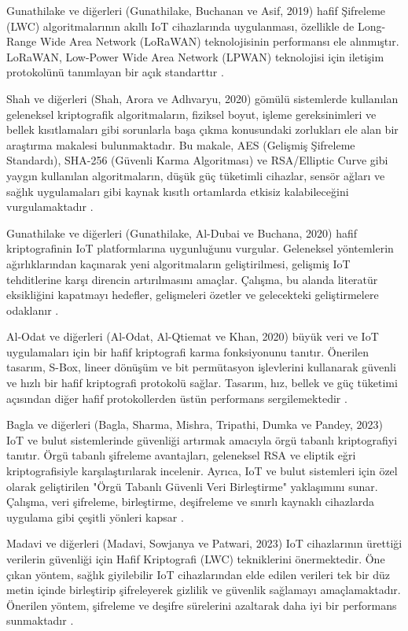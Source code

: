 \documentclass[conference, a4paper]{IEEEtran}
\begin{document}
    Gunathilake ve diğerleri (Gunathilake, Buchanan ve Asif, 2019) hafif Şifreleme (LWC) algoritmalarının akıllı IoT cihazlarında uygulanması, özellikle de Long-Range Wide Area Network (LoRaWAN) teknolojisinin performansı ele alınmıştır. LoRaWAN, Low-Power Wide Area Network (LPWAN) teknolojisi için iletişim protokolünü tanımlayan bir açık standarttır \cite{paper2}.

    Shah ve diğerleri (Shah, Arora ve Adhvaryu, 2020) gömülü sistemlerde kullanılan geleneksel kriptografik algoritmaların, fiziksel boyut, işleme gereksinimleri ve bellek kısıtlamaları gibi sorunlarla başa çıkma konusundaki zorlukları ele alan bir araştırma makalesi bulunmaktadır. Bu makale, AES (Gelişmiş Şifreleme Standardı), SHA-256 (Güvenli Karma Algoritması) ve RSA/Elliptic Curve gibi yaygın kullanılan algoritmaların, düşük güç tüketimli cihazlar, sensör ağları ve sağlık uygulamaları gibi kaynak kısıtlı ortamlarda etkisiz kalabileceğini vurgulamaktadır \cite{paper3}.

    Gunathilake ve diğerleri (Gunathilake, Al-Dubai ve Buchana, 2020) hafif kriptografinin IoT platformlarına uygunluğunu vurgular. Geleneksel yöntemlerin ağırlıklarından kaçınarak yeni algoritmaların geliştirilmesi, gelişmiş IoT tehditlerine karşı direncin artırılmasını amaçlar. Çalışma, bu alanda literatür eksikliğini kapatmayı hedefler, gelişmeleri özetler ve gelecekteki geliştirmelere odaklanır \cite{paper4}.

    Al-Odat ve diğerleri (Al-Odat, Al-Qtiemat ve Khan, 2020) büyük veri ve IoT uygulamaları için bir hafif kriptografi karma fonksiyonunu tanıtır. Önerilen tasarım, S-Box, lineer dönüşüm ve bit permütasyon işlevlerini kullanarak güvenli ve hızlı bir hafif kriptografi protokolü sağlar. Tasarım, hız, bellek ve güç tüketimi açısından diğer hafif protokollerden üstün performans sergilemektedir \cite{paper5}.

    Bagla ve diğerleri (Bagla, Sharma, Mishra, Tripathi, Dumka ve Pandey, 2023) IoT ve bulut sistemlerinde güvenliği artırmak amacıyla örgü tabanlı kriptografiyi tanıtır. Örgü tabanlı şifreleme avantajları, geleneksel RSA ve eliptik eğri kriptografisiyle karşılaştırılarak incelenir. Ayrıca, IoT ve bulut sistemleri için özel olarak geliştirilen "Örgü Tabanlı Güvenli Veri Birleştirme" yaklaşımını sunar. Çalışma, veri şifreleme, birleştirme, deşifreleme ve sınırlı kaynaklı cihazlarda uygulama gibi çeşitli yönleri kapsar \cite{paper6}.

    Madavi ve diğerleri (Madavi, Sowjanya ve Patwari, 2023) IoT cihazlarının ürettiği verilerin güvenliği için Hafif Kriptografi (LWC) tekniklerini önermektedir. Öne çıkan yöntem, sağlık giyilebilir IoT cihazlarından elde edilen verileri tek bir düz metin içinde birleştirip şifreleyerek gizlilik ve güvenlik sağlamayı amaçlamaktadır. Önerilen yöntem, şifreleme ve deşifre sürelerini azaltarak daha iyi bir performans sunmaktadır \cite{paper7}.
\end{document}
